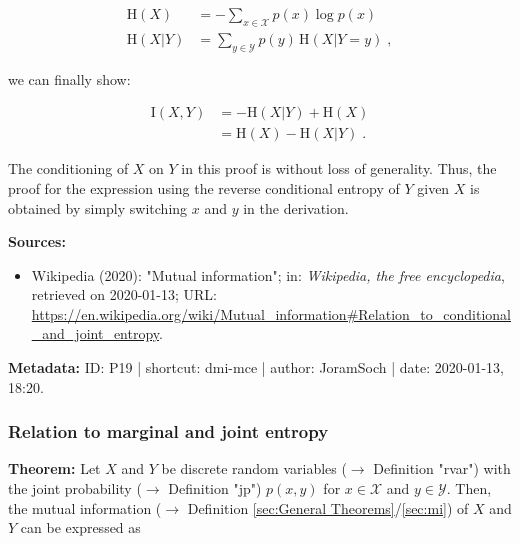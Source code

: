 \documentclass[a4paper,12pt]{book}
\begin{document}
\begin{equation} \label{eq:dmi-mce-ME-CE}
\begin{split}
\mathrm{H}(X) &= - \sum_{x \in \mathcal{X}} p(x) \log p(x) \\
\mathrm{H}(X|Y) &= \sum_{y \in \mathcal{Y}} p(y) \, \mathrm{H}(X|Y=y) \; ,
\end{split}
\end{equation}

we can finally show:

\begin{equation} \label{eq:dmi-mce-MI-qed}
\begin{split}
\mathrm{I}(X,Y) &= - \mathrm{H}(X|Y) + \mathrm{H}(X) \\
&= \mathrm{H}(X) - \mathrm{H}(X|Y) \; .
\end{split}
\end{equation}

The conditioning of $X$ on $Y$ in this proof is without loss of generality. Thus, the proof for the expression using the reverse conditional entropy of $Y$ given $X$ is obtained by simply switching $x$ and $y$ in the derivation.

\vspace{1em}
\textbf{Sources:}
\begin{itemize}
\item Wikipedia (2020): "Mutual information"; in: \textit{Wikipedia, the free encyclopedia}, retrieved on 2020-01-13; URL: \url{https://en.wikipedia.org/wiki/Mutual_information#Relation_to_conditional_and_joint_entropy}.
\end{itemize}


\vspace{1em}
\textbf{Metadata:} ID: P19 | shortcut: dmi-mce | author: JoramSoch | date: 2020-01-13, 18:20.


\subsubsection[\textbf{Relation to marginal and joint entropy}]{Relation to marginal and joint entropy} \label{sec:dmi-mje}

\vspace{1em}
\textbf{Theorem:} Let $X$ and $Y$ be discrete random variables ($\rightarrow$ Definition "rvar") with the joint probability ($\rightarrow$ Definition "jp") $p(x,y)$ for $x \in \mathcal{X}$ and $y \in \mathcal{Y}$. Then, the mutual information ($\rightarrow$ Definition \ref{sec:General Theorems}/\ref{sec:mi}) of $X$ and $Y$ can be expressed as
\end{document}
